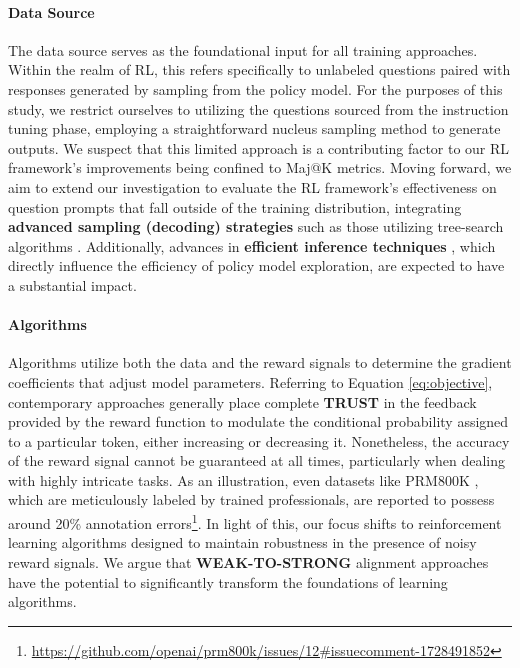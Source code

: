 \begin{itemize}[topsep=0pt]
\paragraph{Data Source} The data source serves as the foundational input for all training approaches. Within the realm of RL, this refers specifically to unlabeled questions paired with responses generated by sampling from the policy model. For the purposes of this study, we restrict ourselves to utilizing the questions sourced from the instruction tuning phase, employing a straightforward nucleus sampling method to generate outputs. We suspect that this limited approach is a contributing factor to our RL framework's improvements being confined to Maj@K metrics. Moving forward, we aim to extend our investigation to evaluate the RL framework's effectiveness on question prompts that fall outside of the training distribution, integrating \textbf{advanced sampling (decoding) strategies} such as those utilizing tree-search algorithms \citep{yao2023tree}. Additionally, advances in \textbf{efficient inference techniques} \citep{xia-etal-2023-speculative,leviathan2023fast,kwon2023efficient,xia2024unlocking}, which directly influence the efficiency of policy model exploration, are expected to have a substantial impact.

\paragraph{Algorithms} Algorithms utilize both the data and the reward signals to determine the gradient coefficients that adjust model parameters. Referring to Equation \ref{eq:objective}, contemporary approaches generally place complete \textbf{TRUST} in the feedback provided by the reward function to modulate the conditional probability assigned to a particular token, either increasing or decreasing it. Nonetheless, the accuracy of the reward signal cannot be guaranteed at all times, particularly when dealing with highly intricate tasks. As an illustration, even datasets like PRM800K \citep{lightman2023let}, which are meticulously labeled by trained professionals, are reported to possess around 20\% annotation errors\footnote{\url{https://github.com/openai/prm800k/issues/12\#issuecomment-1728491852}}. In light of this, our focus shifts to reinforcement learning algorithms designed to maintain robustness in the presence of noisy reward signals. We argue that \textbf{WEAK-TO-STRONG} \citep{burns2023weak} alignment approaches have the potential to significantly transform the foundations of learning algorithms.


\end{itemize}
